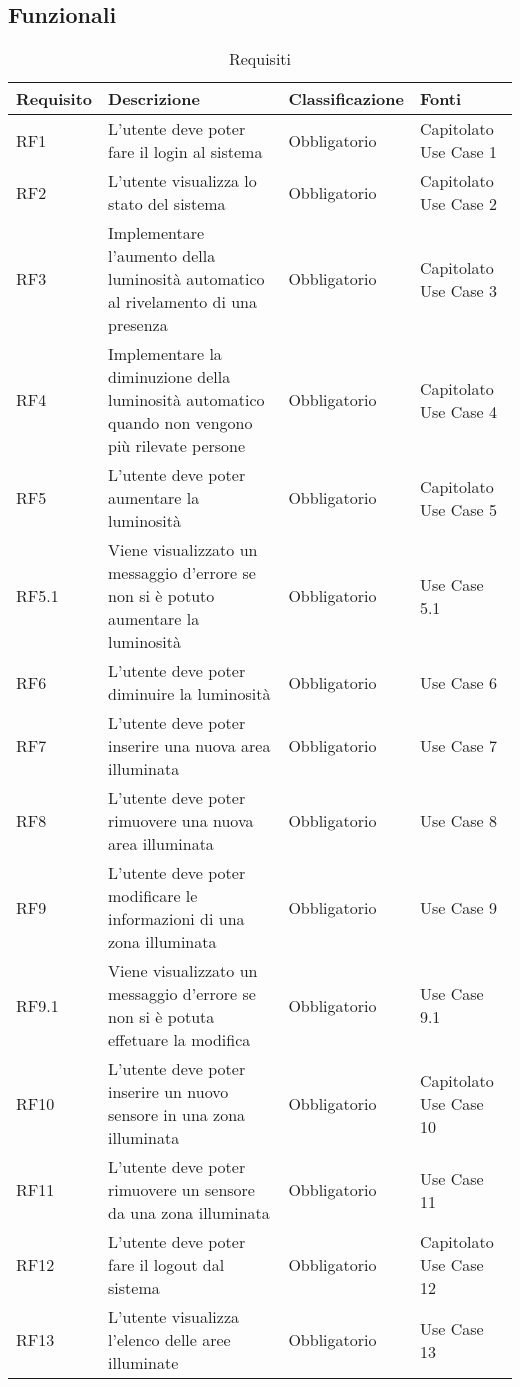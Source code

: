 \documentclass[12pt]{article}
\begin{document}
\subsection{Funzionali}
\begin{longtable}{ |p{1.8cm}|p{5.2cm}|p{3cm}| p{2cm}|}
\caption{Requisiti} \label{tab:tabellaRequisiti} \\
\hline
\textbf{Requisito} & \textbf{Descrizione} & \textbf{Classificazione} & \textbf{Fonti} \\
\hline
\endhead
\hline
\endfoot
RF1  & L'utente deve poter fare il login al sistema  & Obbligatorio & Capitolato Use Case 1 \\
RF2 &  L'utente visualizza lo stato del sistema & Obbligatorio & Capitolato Use Case 2 \\
RF3 &  Implementare l'aumento della luminosità automatico al rivelamento di una presenza & Obbligatorio & Capitolato Use Case 3 \\
RF4 &  Implementare la diminuzione della luminosità automatico quando non vengono più rilevate persone & Obbligatorio & Capitolato Use Case 4\\
RF5 &  L'utente deve poter aumentare la luminosità& Obbligatorio & Capitolato Use Case 5 \\
RF5.1 & Viene visualizzato un messaggio d'errore se non si è potuto aumentare la luminosità & Obbligatorio & Use Case 5.1 \\
RF6 & L'utente deve poter diminuire la luminosità & Obbligatorio & Use Case 6\\
RF7 & L'utente deve poter inserire una nuova area illuminata & Obbligatorio & Use Case 7 \\
RF8 & L'utente deve poter rimuovere una nuova area illuminata & Obbligatorio & Use Case 8\\
RF9 & L'utente deve poter modificare le informazioni di una zona illuminata & Obbligatorio & Use Case 9 \\
RF9.1 &Viene visualizzato un messaggio d'errore se non si è potuta effetuare la modifica & Obbligatorio & Use Case 9.1\\
RF10 & L'utente deve poter inserire un nuovo sensore in una zona illuminata & Obbligatorio & Capitolato Use Case 10 \\
RF11 &  L'utente deve poter rimuovere un sensore da una zona illuminata & Obbligatorio & Use Case 11 \\
RF12 & L'utente deve poter fare il logout dal sistema & Obbligatorio & Capitolato Use Case 12 \\
RF13 & L'utente visualizza l'elenco delle aree illuminate& Obbligatorio & Use Case 13 \\

\end{longtable}
\end{document}
